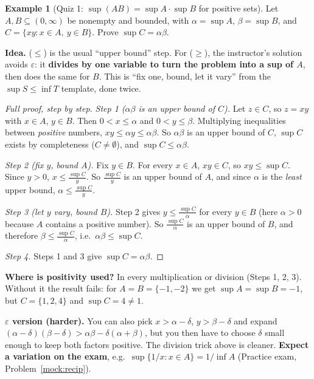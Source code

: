 \documentclass[11pt]{article}
\theoremstyle{definition}
\newtheorem{ex}[defn]{Example}
\newcommand{\eps}{\varepsilon}
\newcommand{\key}[1]{\textcolor{red!70!black}{\textbf{#1}}}
\begin{document}
\begin{ex}[Quiz 1: $\sup(AB)=\sup A\cdot\sup B$ for positive sets]\label{ex:quiz1}
Let $A,B\subseteq(0,\infty)$ be nonempty and bounded, with $\alpha=\sup A$,
$\beta=\sup B$, and $C=\{xy:x\in A,\ y\in B\}$. Prove $\sup C=\alpha\beta$.

\smallskip\noindent\textbf{Idea.} ($\le$) is the usual ``upper bound''
step. For ($\ge$), the instructor's solution avoids $\eps$: it
\key{divides by one variable to turn the problem into a sup of $A$}, then
does the same for $B$. This is ``fix one, bound, let it vary'' from the
$\sup S\le\inf T$ template, done twice.

\begin{proof}[Full proof, step by step]
\emph{Step 1 ($\alpha\beta$ is an upper bound of $C$).} Let $z\in C$, so
$z=xy$ with $x\in A$, $y\in B$. Then $0<x\le\alpha$ and $0<y\le\beta$.
Multiplying inequalities between \emph{positive} numbers,
$xy\le\alpha y\le\alpha\beta$. So $\alpha\beta$ is an upper bound of $C$,
$\sup C$ exists by completeness ($C\ne\emptyset$), and
$\sup C\le\alpha\beta$.

\emph{Step 2 (fix $y$, bound $A$).} Fix $y\in B$. For every $x\in A$,
$xy\in C$, so $xy\le\sup C$. Since $y>0$, $x\le\frac{\sup C}{y}$. So
$\frac{\sup C}{y}$ is an upper bound of $A$, and since $\alpha$ is the
\emph{least} upper bound, $\alpha\le\frac{\sup C}{y}$.

\emph{Step 3 (let $y$ vary, bound $B$).} Step 2 gives
$y\le\frac{\sup C}{\alpha}$ for every $y\in B$ (here $\alpha>0$ because
$A$ contains a positive number). So $\frac{\sup C}{\alpha}$ is an upper
bound of $B$, and therefore $\beta\le\frac{\sup C}{\alpha}$, i.e.\
$\alpha\beta\le\sup C$.

\emph{Step 4.} Steps 1 and 3 give $\sup C=\alpha\beta$.
\end{proof}
\noindent\key{Where is positivity used?} In every multiplication or
division (Steps 1, 2, 3). Without it the result fails: for
$A=B=\{-1,-2\}$ we get $\sup A=\sup B=-1$, but $C=\{1,2,4\}$ and
$\sup C=4\ne1$.

\noindent\key{$\eps$ version (harder).} You can also pick $x>\alpha-\delta$,
$y>\beta-\delta$ and expand
$(\alpha-\delta)(\beta-\delta)>\alpha\beta-\delta(\alpha+\beta)$, but you
then have to choose $\delta$ small enough to keep both factors positive.
The division trick above is cleaner. \textbf{Expect a variation on the
exam}, e.g.\ $\sup\{1/x:x\in A\}=1/\inf A$ (Practice exam,
Problem~\ref{mock:recip}).
\end{ex}
\end{document}
